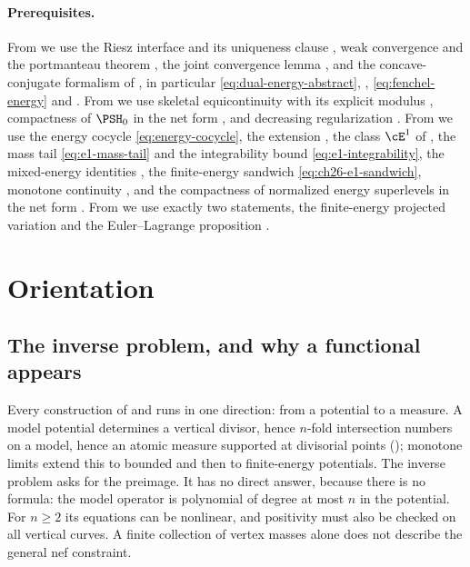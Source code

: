 \paragraph{Prerequisites.}
From  we use the Riesz interface
 and its uniqueness clause
, weak convergence and the portmanteau theorem
, the joint convergence lemma
, and the concave-conjugate formalism of
, in particular
\eqref{eq:dual-energy-abstract}, ,
\eqref{eq:fenchel-energy} and .  From
 we use skeletal equicontinuity
 with its explicit modulus
, compactness of $\PSH_0$
 in the net form
, and decreasing regularization
.  From  we
use the energy cocycle \eqref{eq:energy-cocycle}, the extension
, the class $\cE^1$ of , the
mass tail \eqref{eq:e1-mass-tail} and the integrability bound
\eqref{eq:e1-integrability}, the mixed-energy identities
, the finite-energy sandwich
\eqref{eq:ch26-e1-sandwich}, monotone continuity
, and the compactness of normalized
energy superlevels  in the net form
.  From
 we use exactly two statements, the
finite-energy projected variation  and the
Euler--Lagrange proposition .

\section{Orientation}
\label{sec:ch28-orientation}

\subsection{The inverse problem, and why a functional appears}
\label{sec:ch28-inverse}

Every construction of  and  runs in
one direction: from a potential to a measure.  A model potential determines
a vertical divisor, hence $n$-fold intersection numbers on a model, hence
an atomic measure supported at divisorial points
(); monotone limits extend this to bounded and
then to finite-energy potentials.  The inverse problem asks for the
preimage.  It has no direct answer, because there is no formula: the
model operator is polynomial of degree at most $n$ in the
potential.  For $n\geq2$ its equations can be nonlinear, and positivity
must also be checked on all vertical curves.  A finite collection of vertex
masses alone does not describe the general nef constraint.

